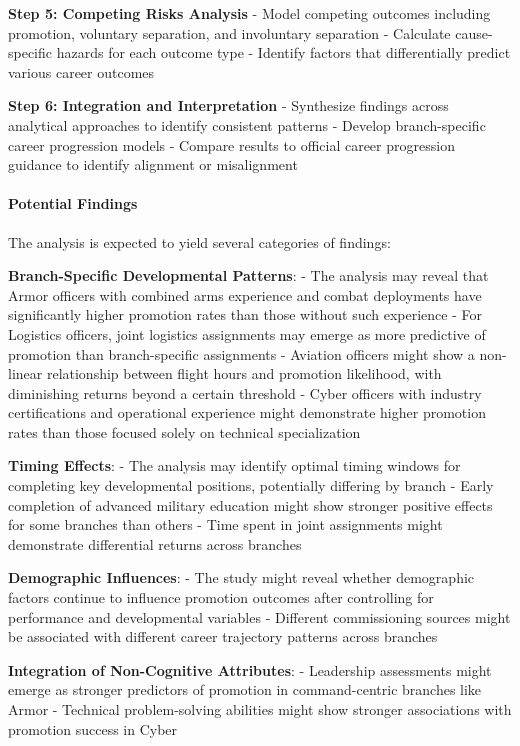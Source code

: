 \documentclass[./main.tex]{subfiles}
\begin{document}
\textbf{Step 5: Competing Risks Analysis} - Model competing outcomes
including promotion, voluntary separation, and involuntary separation -
Calculate cause-specific hazards for each outcome type - Identify
factors that differentially predict various career outcomes

\textbf{Step 6: Integration and Interpretation} - Synthesize findings
across analytical approaches to identify consistent patterns - Develop
branch-specific career progression models - Compare results to official
career progression guidance to identify alignment or misalignment

\paragraph{Potential Findings}\label{potential-findings}

The analysis is expected to yield several categories of findings:

\textbf{Branch-Specific Developmental Patterns}: - The analysis may
reveal that Armor officers with combined arms experience and combat
deployments have significantly higher promotion rates than those without
such experience - For Logistics officers, joint logistics assignments
may emerge as more predictive of promotion than branch-specific
assignments - Aviation officers might show a non-linear relationship
between flight hours and promotion likelihood, with diminishing returns
beyond a certain threshold - Cyber officers with industry certifications
and operational experience might demonstrate higher promotion rates than
those focused solely on technical specialization

\textbf{Timing Effects}: - The analysis may identify optimal timing
windows for completing key developmental positions, potentially
differing by branch - Early completion of advanced military education
might show stronger positive effects for some branches than others -
Time spent in joint assignments might demonstrate differential returns
across branches

\textbf{Demographic Influences}: - The study might reveal whether
demographic factors continue to influence promotion outcomes after
controlling for performance and developmental variables - Different
commissioning sources might be associated with different career
trajectory patterns across branches

\textbf{Integration of Non-Cognitive Attributes}: - Leadership
assessments might emerge as stronger predictors of promotion in
command-centric branches like Armor - Technical problem-solving
abilities might show stronger associations with promotion success in
Cyber
\end{document}
